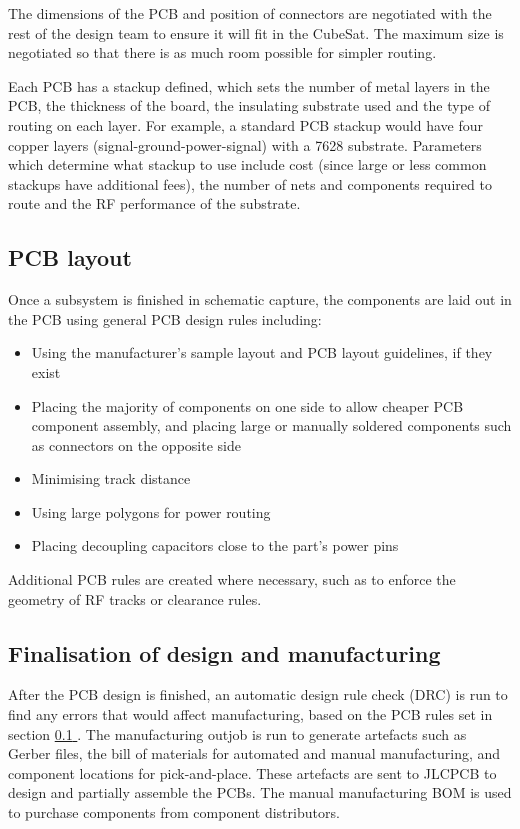 \documentclass[]{report}
\newcommand*{\secref}[1]{section \hyperref[{#1}]{\ref*{#1} \nameref*{#1}}}
\begin{document}
The dimensions of the PCB and position of connectors are negotiated with the rest of the design team to ensure it will fit in the CubeSat. The maximum size is negotiated so that there is as much room possible for simpler routing.

Each PCB has a stackup defined, which sets the number of metal layers in the PCB, the thickness of the board, the insulating substrate used and the type of routing on each layer. For example, a standard PCB stackup would have four copper layers (signal-ground-power-signal) with a 7628 substrate. Parameters which determine what stackup to use include cost (since large or less common stackups have additional fees), the number of nets and components required to route and the RF performance of the substrate.

\subsection{PCB layout}
\label{sec:pcb-layout}

Once a subsystem is finished in schematic capture, the components are laid out in the PCB using general PCB design rules including:

\begin{itemize}
  \item Using the manufacturer's sample layout and PCB layout guidelines, if they exist
  \item Placing the majority of components on one side to allow cheaper PCB component assembly, and placing large or manually soldered components such as connectors on the opposite side
  \item Minimising track distance
  \item Using large polygons for power routing
  \item Placing decoupling capacitors close to the part's power pins
\end{itemize}


Additional PCB rules are created where necessary, such as to enforce the geometry of RF tracks or clearance rules.

\subsection{Finalisation of design and manufacturing}

After the PCB design is finished, an automatic design rule check (DRC) is run to find any errors that would affect manufacturing, based on the PCB rules set in \secref{sec:pcb-layout}. The manufacturing outjob is run to generate artefacts such as Gerber files, the bill of materials for automated and manual manufacturing, and component locations for pick-and-place. These artefacts are sent to JLCPCB to design and partially assemble the PCBs. The manual manufacturing BOM is used to purchase components from component distributors.
\end{document}
